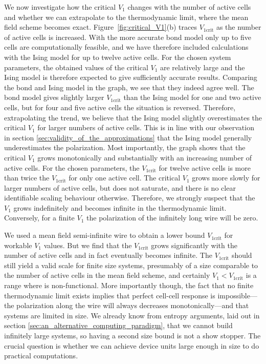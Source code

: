 We now investigate how the critical $V_1$ changes with the number of active
cells and whether we can extrapolate to the thermodynamic limit, where the mean
field scheme becomes exact. Figure~\ref{fig:critical_V1}(b) traces
$V_{1\textrm{crit}}$ as the number of active cells is increased. With the more
accurate bond model only up to five cells are computationally feasible, and we
have therefore included calculations with the Ising model for up to twelve
active cells. For the chosen system parameters, the obtained values of the
critical $V_1$ are relatively large and the Ising model is therefore expected to
give sufficiently accurate results. Comparing the bond and Ising model in the
graph, we see that they indeed agree well. The bond model gives slightly larger
$V_{1\textrm{crit}}$ than the Ising model for one and two active cells, but for
four and five active cells the situation is reversed. Therefore, extrapolating
the trend, we believe that the Ising model slightly overestimates the critical
$V_1$ for larger numbers of active cells. This is in line with our observation
in section \ref{sec:validity_of_the_approximations} that the Ising model
generally underestimates the polarization. Most importantly, the graph shows
that the critical $V_1$ grows monotonically and substantially with an increasing
number of active cells. For the chosen parameters, the $V_{1\textrm{crit}}$ for
twelve active cells is more than twice the $V_{1\textrm{crit}}$ for only one
active cell. The critical $V_1$ grows more slowly for larger numbers of active
cells, but does not saturate, and there is no clear identifiable scaling
behaviour otherwise. Therefore, we strongly suspect that the $V_1$ grows
indefinitely and becomes infinite in the thermodynamic limit. Conversely, for a
finite $V_1$ the polarization of the infinitely long wire will be zero.

We used a mean field semi-infinite wire to obtain a lower bound
$V_{1\textrm{crit}}$ for workable $V_1$ values. But we find that the
$V_{1\textrm{crit}}$ grows significantly with the number of active cells and in
fact eventually becomes infinite. The $V_{1\textrm{crit}}$ should still yield a
valid scale for finite size  systems, presumably of a size comparable
to the number of active cells in the mean field scheme, and certainly $V_1 <
V_{1\textrm{crit}}$ is a range where  is non-functional. More
importantly though, the fact that no finite thermodynamic limit exists implies
that perfect cell-cell response is impossible---the polarization along the wire
will always decreases monotonically---and that  systems are limited in
size. We already know from entropy arguments, laid out in section
\ref{sec:an_alternative_computing_paradigm}, that we cannot build infinitely
large  systems, so having a second size bound is not a show stopper.
The crucial question is whether we can achieve device units large enough in size
to do practical computations.

